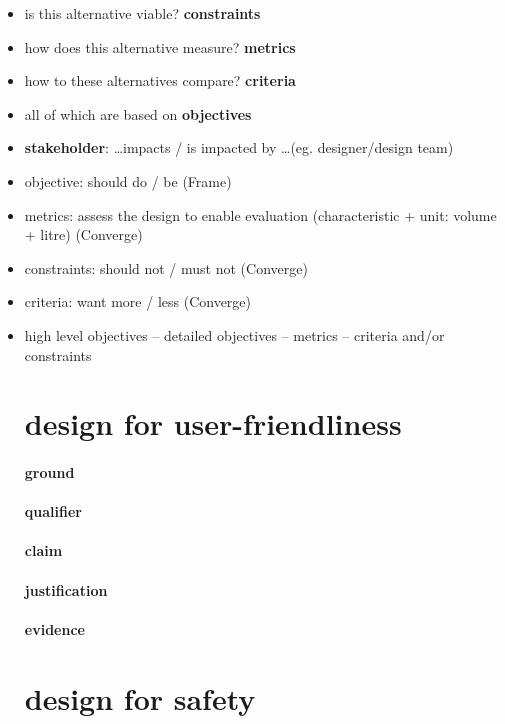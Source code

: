 \documentclass[12pt]{article}
\begin{document}
\begin{itemize}

\item is this alternative viable?  \textbf{constraints}
\item how does this alternative measure? \textbf{metrics}
\item how to these alternatives compare? \textbf{criteria}
\item all of which are based on \textbf{objectives}
\item \textbf{stakeholder}: \dots impacts / is impacted by \dots (eg. designer/design team)
\item objective: should do / be (Frame)
\item metrics: assess the design to enable evaluation (characteristic + unit: volume + litre) (Converge)
\item constraints: should not / must not (Converge)
\item criteria: want more / less (Converge)
\item high level objectives -- detailed objectives -- metrics -- criteria and/or constraints

\section{design for user-friendliness}

\paragraph{ground}

\paragraph{qualifier}

\paragraph{claim}

\paragraph{justification}

\paragraph{evidence}

\section{design for safety}


\end{itemize}
\end{document}
